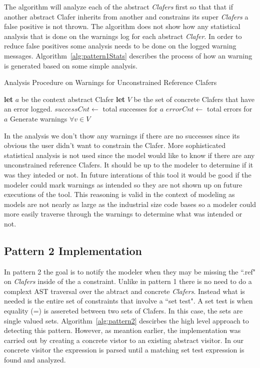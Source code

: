 \documentclass[10pt,oneside]{IEEEtran}
\begin{document}
The algorithm will analyze each of the abstract \textit{Clafers} first so that that if another abstract Clafer inherits from another and constrains its super \textit{Clafers} a false positive is not thrown. The algorithm does not show how any statistical analysis that is done on the warnings log for each abstract \textit{Clafer}. In order to reduce false positives some analysis needs to be done on the logged warning messages. Algorithm~\ref{alg:pattern1Stats} describes the process of how an warning is generated based on some simple analysis.

\begin{algorithm}[H]
\caption{Analysis Procedure on Warnings for Unconstrained Reference Clafers}\label{alg:pattern1Stats}
\begin{algorithmic}[1]
  \State \textbf{let} $a$ be the context abstract Clafer
  \State \textbf{let} $V$ be the set of concrete Clafers that have an error logged.
  \State $successCnt \gets $ total successes for $a$
  \State $errorCnt \gets $ total errors for $a$
    \State Generate warnings $\forall v \in V$
  \EndIf
\EndProcedure
\end{algorithmic}
\end{algorithm}

In the analysis we don't thow any warnings if there are no successes since its obvious the user didn't want to constrain the Clafer. More sophisticated statistical analysis is not used since the model would like to know if there are any unconstrained reference Clafers. It should be up to the modeler to determine if it was they inteded or not. In future interations of this tool it would be good if the modeler could mark warnings as intended so they are not shown up on future executions of the tool. This reasoning is valid in the context of modeling as models are not nearly as large as the industrial size code bases so a modeler could more easily traverse through the warnings to determine what was intended or not.

\subsection{Pattern 2 Implementation}
In pattern 2 the goal is to notify the modeler when they may be missing the ``.ref" on  \textit{Clafers} inside of the a constraint. Unlike in pattern 1 there is no need to do a complext AST traversal over the abtract and concrete \textit{Clafers}. Instead what is needed is the entire set of constraints that involve a ``set test". A set test is when equality (=) is assereted between two sets of Clafers. In this case, the sets are single valued sets. Algorithm~\ref{alg:pattern2} descirbes the high level approach to detecting this pattern. However, as meantion earlier, the implementation was carried out by creating a concrete vistor to an existing abstract visitor. In our concrete visitor the expression is parsed until a matching set test expression is found and analyzed.
\end{document}
